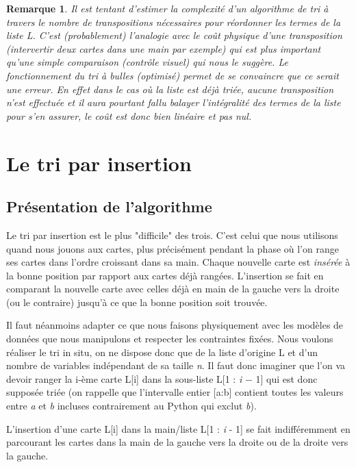 \documentclass[a4paper,10pt]{article}
\newtheorem{remarque}{Remarque}
\begin{document}
\begin{remarque}
    Il est tentant d'estimer la complexité d'un algorithme de tri à travers le nombre de transpositions 
    nécessaires pour réordonner les termes de la liste L. C'est (probablement) l'analogie avec le coût physique 
    d'une transposition (intervertir deux cartes dans une main par exemple) qui est plus important qu'une simple 
    comparaison (contrôle visuel) qui nous le suggère. Le fonctionnement du tri à bulles (optimisé) permet de se 
    convaincre que ce serait une erreur. En effet dans le cas où la liste est déjà triée, aucune transposition n'est 
    effectuée et il aura pourtant fallu balayer l'intégralité des termes de la liste pour s'en assurer, 
    le coût est donc bien linéaire et pas nul.
\end{remarque}


\section{Le tri par insertion}
\subsection{Présentation de l'algorithme}
Le tri par insertion est le plus "difficile" des trois. C'est celui que nous utilisons quand nous jouons aux cartes, 
plus précisément pendant la phase où l'on range ses cartes dans l'ordre croissant dans sa main. 
Chaque nouvelle carte est {\itshape insérée} à la bonne position par rapport aux cartes déjà rangées. 
L'insertion se fait en comparant la nouvelle carte avec celles déjà en main de la gauche vers la droite (ou le contraire) 
jusqu'à ce que la bonne position soit trouvée.

Il faut néanmoins adapter ce que nous faisons physiquement avec les modèles de données que nous 
manipulons et respecter les contraintes fixées. Nous voulons réaliser le tri in situ, on ne dispose donc que 
de la liste d'origine L et d'un nombre de variables indépendant de sa taille {\itshape n}.
Il faut donc imaginer que l'on va devoir ranger la i-ème carte L[i] dans la sous-liste L[1 : {\itshape i} $-$ 1]
qui est donc supposée triée (on rappelle que l'intervalle entier [a:b] contient toutes les valeurs entre {\itshape a} et 
{\itshape b} incluses contrairement au Python qui exclut {\itshape b}).

L'insertion d'une carte L[i] dans la main/liste L[1 : {\itshape i} - 1] se fait indifféremment en 
parcourant les cartes dans la main de la gauche vers la droite ou de la droite vers la gauche. 
\end{document}
